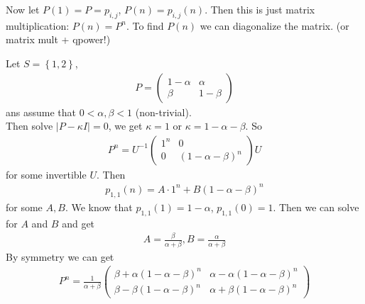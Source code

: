 \documentclass[a4paper]{article}
\begin{document}
Now let $P\left(1\right) = P = p_{i,j}$, $P\left(n\right) = p_{i,j}\left(n\right)$. Then this is just matrix multiplication: $P\left(n\right) = P^n$. To find $P\left(n\right)$ we can diagonalize the matrix. (or matrix mult + qpower!)

\begin{eg}
Let $S=\left\{1,2\right\}$,
\begin{equation*}
\begin{aligned}
P= \left(\begin{matrix}
1-\alpha & \alpha\\
\beta & 1-\beta
\end{matrix}\right)
\end{aligned}
\end{equation*}
ans assume that $0<\alpha,\beta<1$ (non-trivial).\\
Then solve $|P-\kappa I|=0$, we get $\kappa = 1$ or $\kappa = 1-\alpha - \beta$. So
\begin{equation*}
\begin{aligned}
P^n = U^{-1}\left(\begin{matrix}
1^n & 0\\
0 & \left(1-\alpha-\beta\right)^n
\end{matrix}\right)U
\end{aligned}
\end{equation*}
for some invertible $U$. Then
\begin{equation*}
\begin{aligned}
p_{1,1}\left(n\right) = A \cdot 1^n + B\left(1-\alpha-\beta\right)^n
\end{aligned}
\end{equation*}
for some $A,B$. We know that $p_{1,1}\left(1\right) = 1-\alpha$, $p_{1,1}\left(0\right) = 1$. Then we can solve for $A$ and $B$ and get
\begin{equation*}
\begin{aligned}
A=\frac{\beta}{\alpha+\beta},B=\frac{\alpha}{\alpha+\beta}
\end{aligned}
\end{equation*}
By symmetry we can get
\begin{equation*}
\begin{aligned}
P^n = \frac{1}{\alpha+\beta} \left(\begin{matrix}
\beta+\alpha\left(1-\alpha-\beta\right)^n & \alpha-\alpha\left(1-\alpha-\beta\right)^n\\
\beta-\beta\left(1-\alpha-\beta\right)^n & \alpha+\beta\left(1-\alpha-\beta\right)^n
\end{matrix}\right)
\end{aligned}
\end{equation*}


\end{eg}
\end{document}
